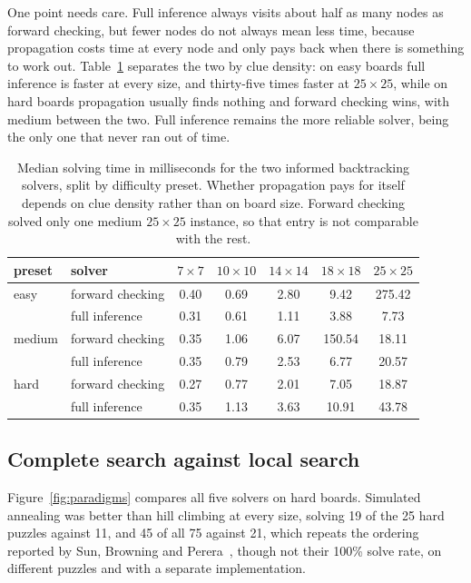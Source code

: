 \documentclass[12pt]{report}
\begin{document}
One point needs care. Full inference always visits about half as many nodes as forward
checking, but fewer nodes do not always mean less time, because propagation costs time at
every node and only pays back when there is something to work out.
Table~\ref{tab:fcfull} separates the two by clue density: on easy boards full inference is
faster at every size, and thirty-five times faster at $25\times25$, while on hard boards
propagation usually finds nothing and forward checking wins, with medium between the two.
Full inference remains the more reliable solver, being the only one that never ran out of
time.

\begin{table}[H]
  \centering
  \begin{tabular}{llccccc}
    \hline
    preset & solver & $7\times7$ & $10\times10$ & $14\times14$ & $18\times18$ & $25\times25$ \\
    \hline
    easy & forward checking & 0.40 & 0.69 & 2.80 & 9.42 & 275.42 \\
     & full inference & 0.31 & 0.61 & 1.11 & 3.88 & 7.73 \\
    medium & forward checking & 0.35 & 1.06 & 6.07 & 150.54 & 18.11 \\
     & full inference & 0.35 & 0.79 & 2.53 & 6.77 & 20.57 \\
    hard & forward checking & 0.27 & 0.77 & 2.01 & 7.05 & 18.87 \\
     & full inference & 0.35 & 1.13 & 3.63 & 10.91 & 43.78 \\
    \hline
  \end{tabular}
  \caption{Median solving time in milliseconds for the two informed
  backtracking solvers, split by difficulty preset. Whether propagation
  pays for itself depends on clue density rather than on board size.
  Forward checking solved only one medium $25\times25$ instance, so that
  entry is not comparable with the rest.}
  \label{tab:fcfull}
\end{table}

\newpage
\subsection{Complete search against local search}

Figure~\ref{fig:paradigms} compares all five solvers on hard boards. Simulated annealing
was better than hill climbing at every size, solving 19 of the 25 hard puzzles against 11,
and 45 of all 75 against 21, which repeats the ordering reported by Sun, Browning and
Perera~\cite{light_up_ai}, though not their 100\% solve rate, on different puzzles and with
a separate implementation.
\end{document}

